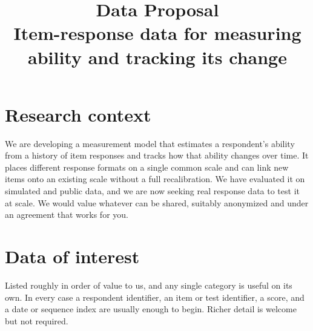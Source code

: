 \documentclass[11pt]{article}
\title{\vspace{-3em}Data Proposal\\[0.2em]
\large Item-response data for measuring ability and tracking its change}
\author{}
\date{}
\begin{document}
\maketitle
\vspace{-3.5em}

\section*{Research context}

We are developing a measurement model that estimates a respondent's
ability from a history of item responses and tracks how that ability
changes over time. It places different response formats on a single
common scale and can link new items onto an existing scale without a full
recalibration. We have evaluated it on simulated and public data, and we
are now seeking real response data to test it at scale. We would value
whatever can be shared, suitably anonymized and under an agreement that
works for you.

\section*{Data of interest}

Listed roughly in order of value to us, and any single category is useful
on its own. In every case a respondent identifier, an item or test
identifier, a score, and a date or sequence index are usually enough to
begin. Richer detail is welcome but not required.
\end{document}
